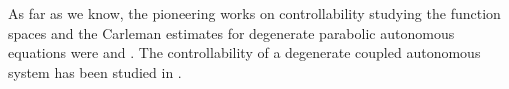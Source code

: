 \documentclass[11pt,oneside,a4papper]{osajnl}
\begin{document}

	


As far as we know, the pioneering works on controllability studying the function spaces and the Carleman estimates for degenerate parabolic autonomous equations were \cite{Alabau_cannarsa_fragnelli-06} and \cite{Cannarsa_Martinez_Vancostenoble-2005}. The controllability of a degenerate coupled autonomous system has been studied in \cite{AitBenHassi-11, AitBenHassi-13}. 
\end{document}
